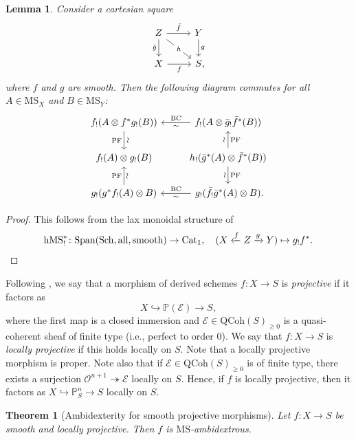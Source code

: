 \documentclass{amsart}
\numberwithin{equation}{section}
\theoremstyle{plain}
\newtheorem{theorem}[equation]{Theorem}
\newtheorem{lemma}[equation]{Lemma}
\theoremstyle{definition}
\let\scr=\mathcal
\let\bb=\mathbb
\def\P{\bb P}
\def\h{\mathrm h}
\let\into=\hookrightarrow
\let\onto=\twoheadrightarrow
\def\QCoh{\mathrm{QCoh}{}}
\let\cat=\mathrm
\def\Sch{\cat{S}\mathrm{ch}{}}
\def\MS{\mathrm{MS}}
\def\Cat{\mathrm{C}\mathrm{at}{}}
\def\all{\mathrm{all}}
\def\Span{\mathrm{Span}}
\begin{document}
\begin{lemma}\label{lem:PF-BC-!}
	Consider a cartesian square
	\[
	\begin{tikzcd}
	Z \ar{d}[swap]{\bar g} \ar{r}{\bar f} \ar{dr}[description]{h} & Y \ar{d}{g} \\
	X \ar{r}[swap]{f} & S\rlap,
	\end{tikzcd}
	\]
	where $f$ and $g$ are smooth.
	Then the following diagram commutes for all $A\in \MS_X$ and $B\in\MS_Y$:
	\[
	\begin{tikzcd}[column sep=2.5em]
	f_! (A\otimes f^*g_! (B)) \ar{d}[sloped]{\sim}[swap]{\mathrm{PF}} \ar[<-]{r}{\mathrm{BC}}[swap]{\sim} & f_! (A\otimes \bar g_! \bar f^*(B))  \\
	f_! (A)\otimes g_! (B) & h_! (\bar g^*(A)\otimes \bar f^*(B)) \ar{d}{\mathrm{PF}}[swap,sloped]{\sim} \ar{u}[sloped]{\sim}[swap]{\mathrm{PF}}  \\
	g_! (g^*f_! (A)\otimes B) \ar{u}{\mathrm{PF}}[swap,sloped]{\sim} \ar[<-]{r}{\mathrm{BC}}[swap]{\sim} & g_! (\bar f_! \bar g^*(A)\otimes B)\rlap.
	\end{tikzcd}
	\]
\end{lemma}

\begin{proof}
This follows from the lax monoidal structure of 
\[
\h\MS^*_{!}\colon \Span(\Sch,\all,\mathrm{smooth})\to\Cat_1, \quad (X\xleftarrow{f} Z\xrightarrow{g} Y)\mapsto g_{!} f^*.\qedhere
\]
\end{proof}

Following \cite[Définition 5.5.2]{EGA2}, we say that a morphism of derived schemes $f\colon X\to S$ is \emph{projective} if it factors as
\[
X\into \P(\scr E) \to S,
\]
where the first map is a closed immersion and $\scr E\in \QCoh(S)_{\geq 0}$ is a quasi-coherent sheaf of finite type (i.e., perfect to order $0$).
We say that $f\colon X\to S$ is \emph{locally projective} if this holds locally on $S$. Note that a locally projective morphism is proper.
Note also that if $\scr E\in\QCoh(S)_{\geq 0}$ is of finite type, there exists a surjection $\scr O^{n+1}\onto \scr E$ locally on $S$.
Hence, if $f$ is locally projective, then it factors as $X\into \P^n_S\to S$ locally on $S$.

\begin{theorem}[Ambidexterity for smooth projective morphisms]
	\label{thm:ambidexterity}
	Let $f\colon X\to S$ be smooth and locally projective. Then $f$ is $\MS$-ambidextrous.
\end{theorem}
\end{document}
